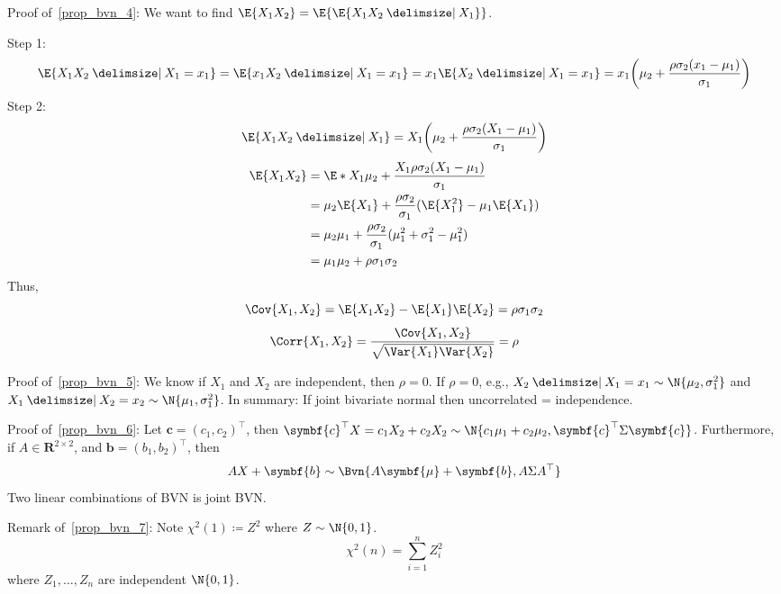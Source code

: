 \begin{Proof}{}{}
    Proof of~\ref{prop_bvn_4}: We want to find $ \E{X_1X_2}=\E{\E{X_1X_2\given X_1}} $.

    Step 1:
    \[ \E{X_1X_2\given X_1=x_1}=\E{x_1X_2\given X_1=x_1}=
        x_1\E{X_2\given X_1=x_1}=x_1
        \biggl(  \mu_2+\frac{\rho\sigma_2(x_1-\mu_1)}{\sigma_1} \biggr) \]
    Step 2:
    \[ \E{X_1X_2\given X_1}=X_1
        \biggl(  \mu_2+\frac{\rho\sigma_2(X_1-\mu_1)}{\sigma_1} \biggr)
    \]
    \begin{align*}
        \E{X_1X_2}
         & = \E*{X_1\mu_2+\frac{X_1\rho\sigma_2(X_1-\mu_1)}{\sigma_1}}            \\
         & =\mu_2\E{X_1}+\frac{\rho\sigma_2}{\sigma_1}
        (\E{X_1^2}-\mu_1\E{X_1})                                                  \\
         & =\mu_2\mu_1+\frac{\rho\sigma_2}{\sigma_1}( \mu_1^2+\sigma_1^2-\mu_1^2) \\
         & =\mu_1\mu_2+\rho\sigma_1\sigma_2
    \end{align*}
    Thus,
    \[ \Cov{X_1,X_2}=\E{X_1X_2}-\E{X_1}\E{X_2}=\rho\sigma_1\sigma_2  \]
    \[ \Corr{X_1,X_2}=\frac{\Cov{X_1,X_2}}{\sqrt{\Var{X_1}\Var{X_2}}}=\rho  \]

    Proof of~\ref{prop_bvn_5}: We know if $ X_1 $ and $ X_2 $ are independent, then $ \rho=0 $.
    If $ \rho=0 $, e.g., $ X_2\given X_1=x_1 \sim \N{\mu_2,\sigma_1^2} $
    and $ X_1\given X_2=x_2 \sim \N{\mu_1,\sigma_1^2} $.
    In summary: If joint bivariate normal then uncorrelated = independence.

    Proof of~\ref{prop_bvn_6}: Let $ \symbf{c}=(c_1,c_2)^\top $, then
    $ \symbf{c}^\top X=c_1X_2+c_2X_2 \sim \N{c_1\mu_1+c_2\mu_2,\symbf{c}^\top \Sigma\symbf{c}} $.
    Furthermore, if $ A\in\mathbf{R}^{2\times 2} $, and
    $ \symbf{b}=(b_1,b_2)^\top $, then
    \[ AX+\symbf{b} \sim \Bvn{A\symbf{\mu}+\symbf{b},A\Sigma A^\top} \]
    Two linear combinations of BVN is joint BVN.\
\end{Proof}
\begin{Remark}{}{}
    Remark of~\ref{prop_bvn_7}: Note $ \chi^2(1)\coloneq Z^2 $ where $ Z \sim \N{0,1} $.
    \[ \chi^2(n)=
        \sum_{i=1}^{n} Z_i^2 \]
    where $ Z_1,\ldots,Z_n $ are independent $ \N{0,1} $.
\end{Remark}
